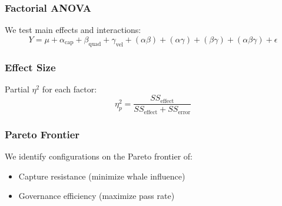 \subsubsection{Factorial ANOVA}

We test main effects and interactions:
\begin{equation}
Y = \mu + \alpha_{\text{cap}} + \beta_{\text{quad}} + \gamma_{\text{vel}} + (\alpha\beta) + (\alpha\gamma) + (\beta\gamma) + (\alpha\beta\gamma) + \epsilon
\end{equation}

\subsubsection{Effect Size}

Partial $\eta^2$ for each factor:
\begin{equation}
\eta^2_p = \frac{SS_{\text{effect}}}{SS_{\text{effect}} + SS_{\text{error}}}
\end{equation}

\subsubsection{Pareto Frontier}

We identify configurations on the Pareto frontier of:
\begin{itemize}
    \item Capture resistance (minimize whale influence)
    \item Governance efficiency (maximize pass rate)
\end{itemize}
